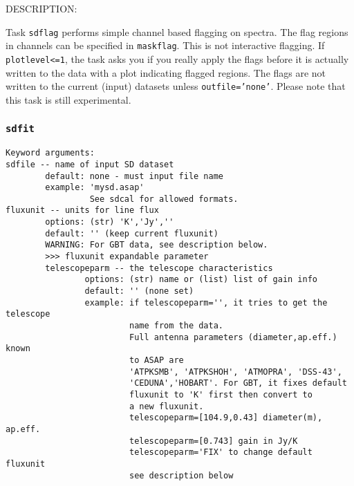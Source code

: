     DESCRIPTION:

    Task {\tt sdflag} performs simple channel based flagging on spectra.
    The flag regions in channels can be specified in {\tt maskflag}. This
    is not interactive flagging. If {\tt plotlevel<=1}, the task asks 
    you if you really apply the flags before it is actually written to the data 
    with a plot indicating flagged regions. The flags
    are not written to the current (input) datasets unless {\tt outfile='none'}.
    Please note that this task is still experimental.


\subsubsection{{\tt sdfit}}
\label{section:sd.sdtasks.tasks.sdfit}

\begin{verbatim}
Keyword arguments:
sdfile -- name of input SD dataset
        default: none - must input file name
        example: 'mysd.asap'
                 See sdcal for allowed formats.
fluxunit -- units for line flux
        options: (str) 'K','Jy',''
        default: '' (keep current fluxunit)
        WARNING: For GBT data, see description below.
        >>> fluxunit expandable parameter
        telescopeparm -- the telescope characteristics
                options: (str) name or (list) list of gain info
                default: '' (none set)
                example: if telescopeparm='', it tries to get the telescope
                         name from the data.
                         Full antenna parameters (diameter,ap.eff.) known
                         to ASAP are
                         'ATPKSMB', 'ATPKSHOH', 'ATMOPRA', 'DSS-43',
                         'CEDUNA','HOBART'. For GBT, it fixes default 
                         fluxunit to 'K' first then convert to 
                         a new fluxunit.
                         telescopeparm=[104.9,0.43] diameter(m), ap.eff.
                         telescopeparm=[0.743] gain in Jy/K
                         telescopeparm='FIX' to change default fluxunit
                         see description below


\end{verbatim}
